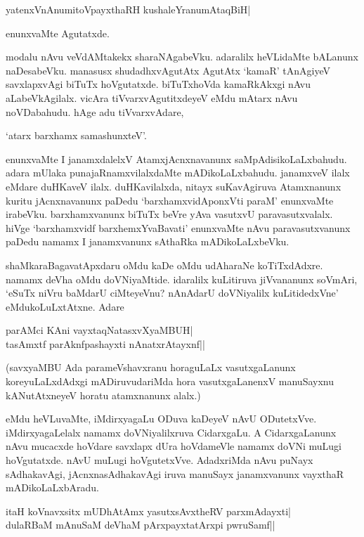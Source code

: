 \begin{shloka}
yatenxVnAnumitoVpayxthaRH kushaleYranumAtaqBiH|
\end{shloka}

enunxvaMte Agutatxde.

modalu nAvu veVdAMtakekx sharaNAgabeVku. adaralilx heVLidaMte bALanunx naDesabeVku. manasusx shudadhxvAgutAtx AgutAtx `kamaR' tAnAgiyeV savxlapxvAgi biTuTx hoVgutatxde. biTuTxhoVda kamaRkAkxgi nAvu aLabeVkAgilalx. vicAra tiVvarxvAgutitxdeyeV eMdu mAtarx nAvu noVDabahudu. hAge adu tiVvarxvAdare,

\begin{shloka}
`atarx barxhamx samashunxteV'.
\end{shloka}

\noindent enunxvaMte I janamxdalelxV AtamxjAcnxnavanunx saMpAdisikoLaLxbahudu. adara mUlaka punajaRnamxvilalxdaMte mADikoLaLxbahudu. janamxveV ilalx eMdare duHKaveV ilalx. duHKavilalxda, nitayx suKavAgiruva Atamxnanunx kuritu jAcnxnavanunx paDedu `barxhamxvidAponxVti paraM' enunxvaMte irabeVku. barxhamxvanunx biTuTx beVre yAva vasutxvU paravasutxvalalx. hiVge `barxhamxvidf barxhemxYvaBavati' enunxvaMte nAvu paravasutxvanunx paDedu namamx I janamxvanunx sAthaRka mADikoLaLxbeVku.

shaMkaraBagavatApxdaru oMdu kaDe oMdu udAharaNe koTiTxdAdxre. namamx deVha oMdu doVNiyaMtide. idaralilx kuLitiruva jiVvananunx soVmAri, `eSuTx niVru baMdarU ciMteyeVnu? nAnAdarU doVNiyalilx kuLitidedxVne' eMdukoLuLxtAtxne. Adare

\begin{shloka}
parAMci KAni vayxtaqNatasxvXyaMBUH|\\
tasAmxtf parAknfpashayxti nAnatxrAtayxnf||
\end{shloka}

(savxyaMBU Ada parameVshavxranu horaguLaLx vasutxgaLanunx koreyuLaLxdAdxgi mADiruvudariMda hora vasutxgaLanenxV manuSayxnu kANutAtxneyeV horatu atamxnanunx alalx.)

eMdu heVLuvaMte, iMdirxyagaLu ODuva kaDeyeV nAvU ODutetxVve. iMdirxyagaLelalx namamx doVNiyalilxruva CidarxgaLu. A CidarxgaLanunx nAvu mucacxde hoVdare savxlapx dUra hoVdameVle namamx doVNi muLugi hoVgutatxde. nAvU muLugi hoVgutetxVve. AdadxriMda nAvu puNayx sAdhakavAgi, jAcnxnasAdhakavAgi iruva manuSayx janamxvanunx vayxthaR mADikoLaLxbAradu.

\begin{shloka}
itaH koV\s navxsitx mUDhAtAmx yasutxsAvxtheRV parxmAdayxti|\\
dulaRBaM mAnuSaM deVhaM pArxpayxtatArxpi pwruSamf||
\end{shloka}

